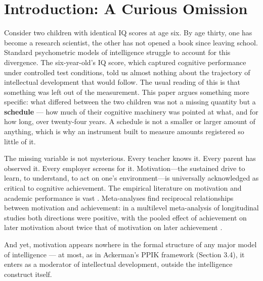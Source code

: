 \documentclass[12pt,a4paper]{article}
\begin{document}
\begin{abstract}
\medskip
\noindent\textbf{Keywords:} intelligence, motivation, allocation policy, construct validity, recursive systems, operational knowledge, psychometrics, CHC theory
\end{abstract}


\section{Introduction: A Curious Omission}

Consider two children with identical IQ scores at age six. By age thirty, one has become a research scientist, the other has not opened a book since leaving school. Standard psychometric models of intelligence struggle to account for this divergence. The six-year-old's IQ score, which captured cognitive performance under controlled test conditions, told us almost nothing about the trajectory of intellectual development that would follow. The usual reading of this is that something was left out of the measurement. This paper argues something more specific: what differed between the two children was not a missing quantity but a \textbf{schedule} ---\hspace{0pt} how much of their cognitive machinery was pointed at what, and for how long, over twenty-four years. A schedule is not a smaller or larger amount of anything, which is why an instrument built to measure amounts registered so little of it.

The missing variable is not mysterious. Every teacher knows it. Every parent has observed it. Every employer screens for it. Motivation---\hspace{0pt}the sustained drive to learn, to understand, to act on one's environment---\hspace{0pt}is universally acknowledged as critical to cognitive achievement. The empirical literature on motivation and academic performance is vast \citep{DeciRyan2000,Dweck2006,WigfieldEccles2000}. Meta-analyses find reciprocal relationships between motivation and achievement: in a multilevel meta-analysis of longitudinal studies both directions were positive, with the pooled effect of achievement on later motivation about twice that of motivation on later achievement \citep{Vu2024}.

And yet, motivation appears nowhere in the formal structure of any major model of intelligence ---\hspace{0pt} at most, as in Ackerman's PPIK framework (Section 3.4), it enters as a moderator of intellectual development, outside the intelligence construct itself.
\end{document}

